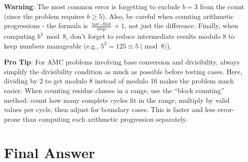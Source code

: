\documentclass[11pt]{article}
\begin{document}
\begin{warningbox}
\textbf{Warning}: The most common error is forgetting to exclude $b = 3$ from the count (since the problem requires $b \geq 5$). Also, be careful when counting arithmetic progressions - the formula is $\frac{\text{last} - \text{first}}{\text{step}} + 1$, not just the difference. Finally, when computing $b^3 \bmod 8$, don't forget to reduce intermediate results modulo 8 to keep numbers manageable (e.g., $5^3 = 125 \equiv 5 \pmod{8}$).
\end{warningbox}

\begin{tipbox}
\textbf{Pro Tip}: For AMC problems involving base conversion and divisibility, always simplify the divisibility condition as much as possible before testing cases. Here, dividing by 2 to get modulo 8 instead of modulo 16 makes the problem much easier. When counting residue classes in a range, use the ``block counting'' method: count how many complete cycles fit in the range, multiply by valid values per cycle, then adjust for boundary cases. This is faster and less error-prone than computing each arithmetic progression separately.
\end{tipbox}

\section*{Final Answer}

\end{document}
